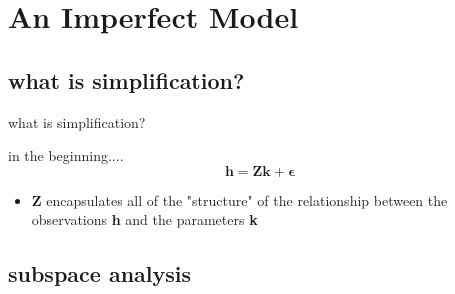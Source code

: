 \documentclass{beamer}
\begin{document}
\section{An Imperfect Model}
\subsection{what is simplification?} 
\begin{frame}
\begin{center}
what is simplification?
\end{center}
\end{frame}

\begin{frame}{in the beginning....}
\begin{equation*}
\textbf{h} = \textbf{Zk} + {\boldsymbol \epsilon}
\end{equation*}
\begin{itemize}
\item{\textbf{Z} encapsulates all of the "structure" of the relationship between the observations \textbf{h} and the parameters \textbf{k}}
\end{itemize}
\end{frame}



\subsection{subspace analysis}

\begin{frame}%
\begin{figure}
\begin{center}
\end{center}
\end{figure}
\end{frame}


\begin{frame}%
\begin{figure}
\begin{center}
\end{center}
\end{figure}
\end{frame}
\end{document}
